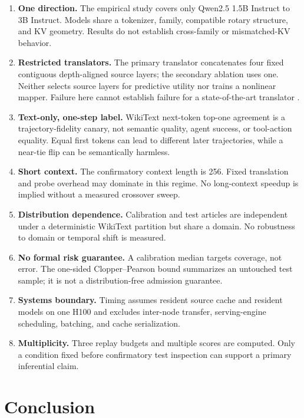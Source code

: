 \documentclass[10pt,twocolumn]{article}
\begin{document}
\begin{enumerate}[leftmargin=*,itemsep=2pt]
  \item \textbf{One direction.}  The empirical study covers only Qwen2.5
  1.5B Instruct to 3B Instruct.  Models share a tokenizer, family, compatible
  rotary structure, and KV geometry.  Results do not establish cross-family or
  mismatched-KV behavior.
  \item \textbf{Restricted translators.}  The primary translator concatenates
  four fixed contiguous depth-aligned source layers; the secondary ablation
  uses one.  Neither selects source layers for predictive utility nor trains a
  nonlinear mapper.  Failure here cannot establish failure for a
  state-of-the-art translator \citep{heo2026crossmodel}.
  \item \textbf{Text-only, one-step label.}  WikiText next-token top-one
  agreement is a trajectory-fidelity canary, not semantic quality, agent
  success, or tool-action equality.  Equal first tokens can lead to different
  later trajectories, while a near-tie flip can be semantically harmless.
  \item \textbf{Short context.}  The confirmatory context length is 256.
  Fixed translation and probe overhead may dominate in this regime.  No
  long-context speedup is implied without a measured crossover sweep.
  \item \textbf{Distribution dependence.}  Calibration and test articles are
  independent under a deterministic WikiText partition but share a domain.
  No robustness to domain or temporal shift is measured.
  \item \textbf{No formal risk guarantee.}  A calibration median targets
  coverage, not error.  The one-sided Clopper--Pearson bound summarizes an
  untouched test sample; it is not a distribution-free admission guarantee.
  \item \textbf{Systems boundary.}  Timing assumes resident source cache and
  resident models on one H100 and excludes inter-node transfer, serving-engine
  scheduling, batching, and cache serialization.
  \item \textbf{Multiplicity.}  Three replay budgets and multiple scores are
  computed.  Only a condition fixed before confirmatory test inspection can
  support a primary inferential claim.
\end{enumerate}

\section{Conclusion}
\end{document}
